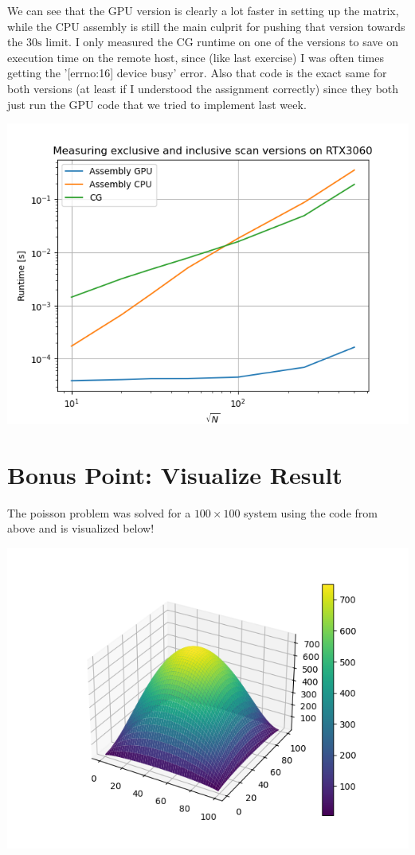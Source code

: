 \documentclass[11pt]{article}
\begin{document}
We can see that the GPU version is clearly a lot faster in setting up the matrix, while the CPU assembly is still the main culprit for pushing that version towards the \(30\mathrm{s}\) limit. I only measured the CG runtime on one of the versions to save on execution time on the remote host, since (like last exercise) I was often times getting the '[errno:16] device busy' error. Also that code is the exact same for both versions (at least if I understood the assignment correctly) since they both just run the GPU code that we tried to implement last week.

\includegraphics[scale=0.8]{plots/2comp.png}
\pagebreak
\section{Bonus Point: Visualize Result}

The poisson problem was solved for a \( 100 \times 100\) system using the code from above and is visualized below!

\includegraphics{plots/surf.png}
\end{document}
